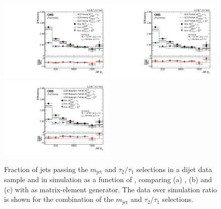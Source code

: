 \begin{figure}[htbp]
\centering
\includegraphics[width=0.49\textwidth]{figures/vtagging/JME-16-003/BoostedW/BkgEff_DataMC_herwig_pT.pdf}
\includegraphics[width=0.49\textwidth]{figures/vtagging/JME-16-003/BoostedW/BkgEff_DataMC_Pythia8_pT.pdf}\\
\includegraphics[width=0.49\textwidth]{figures/vtagging/JME-16-003/BoostedW/BkgEff_DataMC_Pythia8Madgraph_pT.pdf}
\caption{ 
Fraction of jets passing the $m_{\mathrm{jet}}$ and $\tau_2/\tau_1$ selections in a dijet data sample and in
simulation as a function of \pt, comparing (a) \HERWIG{++}, (b)  and (c)  with \MADGRAPH as matrix-element generator.
The data over simulation ratio is shown for the combination of the $m_{\mathrm{jet}}$ and $\tau_2/\tau_1$ selections.}
\label{fig:searchII:fakerate}
\end{figure}
   

